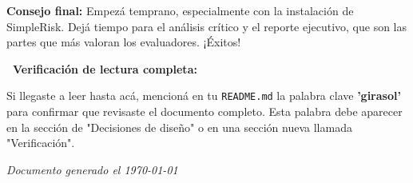 \documentclass[11pt,a4paper]{article}
\begin{document}
\begin{tipbox}
\textbf{Consejo final:} Empezá temprano, especialmente con la instalación de SimpleRisk. Dejá tiempo para el análisis crítico y el reporte ejecutivo, que son las partes que más valoran los evaluadores. ¡Éxitos!
\end{tipbox}

\vspace{1cm}

\begin{mdframed}[backgroundcolor=yellow!10, linecolor=orange, linewidth=2pt]
\textbf{\faSearch\ Verificación de lectura completa:}

Si llegaste a leer hasta acá, mencioná en tu \texttt{README.md} la palabra clave \textbf{'girasol'} para confirmar que revisaste el documento completo. Esta palabra debe aparecer en la sección de "Decisiones de diseño" o en una sección nueva llamada "Verificación".
\end{mdframed}

\vfill
\begin{center}
\textit{Documento generado el \today}
\end{center}
\end{document}
